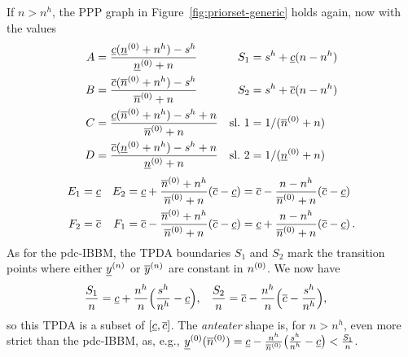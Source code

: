 If $n > n^h$, the PPP graph in Figure~\ref{fig:priorset-generic}
holds again, now with the values
\begin{align*}
A   &= \frac{\cl (\nzl + n^h) - s^h}    {\nzl + n} & %
S_1 &= s^h + \cl (n - n^h) \\ %
B   &= \frac{\cu (\nzu + n^h) - s^h}    {\nzu + n} & %
S_2 &= s^h + \cu (n - n^h) \\ %
C   &= \frac{\cl (\nzu + n^h) - s^h + n}{\nzu + n} & %
\text{sl.~1} &= 1/(\nzu + n) \\
D   &= \frac{\cu (\nzl + n^h) - s^h + n}{\nzl + n} &  %
\text{sl.~2} &= 1/(\nzl + n)
\end{align*}%
\begin{align*}
E_1 &= \cl &
E_2 &= \cl + \frac{\nzu + n^h }{\nzu + n} (\cu - \cl) %
     = \cu - \frac{ n   - n^h }{\nzu + n} (\cu - \cl) \\ %
F_2 &= \cu &
F_1 &= \cu - \frac{\nzu + n^h }{\nzu + n} (\cu - \cl) %
     = \cl + \frac{ n   - n^h }{\nzu + n} (\cu - \cl) \,.%
\end{align*}
As for the pdc-IBBM, the TPDA boundaries $S_1$ and $S_2$ mark the transition points
where either $\underline{y}^{(n)}$ or $\overline{y}^{(n)}$ are constant in $n^{(0)}$. We now have
\begin{align*}
\frac{S_1}{n} &= \underline{c} + \frac{n^h}{n}\Big( \frac{s^h}{n^h} - \underline{c} \Big), &
\frac{S_2}{n} &= \overline{c} - \frac{n^h}{n}\Big( \overline{c} - \frac{s^h}{n^h} \Big),
\end{align*}
so this TPDA is a subset of $[\underline{c}, \overline{c}]$. The \emph{anteater}
shape is, for $n>n^h$, even more strict than the pdc-IBBM, as, e.g.,
$\underline{y}^{(0)}(\overline{n}^{(0)}) = \underline{c} - \frac{n^h}{\overline{n}^{(0)}}\big( \frac{s^h}{n^h} - \underline{c} \big) < \frac{S_1}{n}$.


